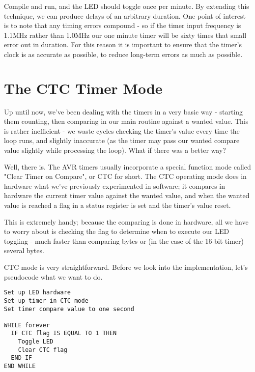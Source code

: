 \documentclass[a4paper,oneside,notitlepage]{book}
\begin{document}
Compile and run, and the LED should toggle once per minute. By extending this technique, we can produce delays of an arbitrary duration. One point of interest is to note that any timing errors compound - so if the timer input frequency is 1.1MHz rather than 1.0MHz our one minute timer will be sixty times that small error out in duration. For this reason it is important to ensure that the timer's clock is as accurate as possible, to reduce long-term errors as much as possible.


\label{chp:CTCMode}
\chapter{The CTC Timer Mode}

Up until now, we've been dealing with the timers in a very basic way - starting them counting, then comparing in our main routine against a wanted value. This is rather inefficient - we waste cycles checking the timer's value every time the loop runs, and slightly inaccurate (as the timer may pass our wanted compare value slightly while processing the loop). What if there was a better way?

Well, there is. The AVR timers usually incorporate a special function mode called "Clear Timer on Compare", or CTC for short. The CTC operating mode does in hardware what we've previously experimented in software; it compares in hardware the current timer value against the wanted value, and when the wanted value is reached a flag in a status register is set and the timer's value reset.

This is extremely handy; because the comparing is done in hardware, all we have to worry about is checking the flag to determine when to execute our LED toggling - much faster than comparing bytes or (in the case of the 16-bit timer) several bytes.

CTC mode is very straightforward. Before we look into the implementation, let's pseudocode what we want to do.

\begin{center}
\begin{lstlisting}[keywordstyle=\color{black},commentstyle=\color{black}]
Set up LED hardware
Set up timer in CTC mode
Set timer compare value to one second

WHILE forever
  IF CTC flag IS EQUAL TO 1 THEN
    Toggle LED
    Clear CTC flag
  END IF
END WHILE
\end{lstlisting}
\end{center}
\end{document}

